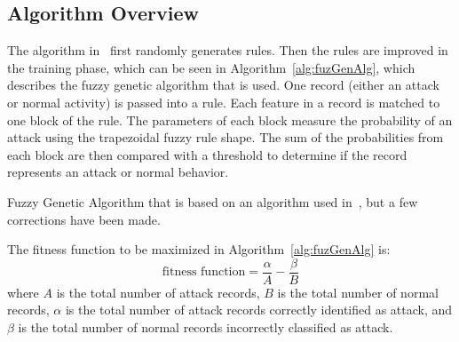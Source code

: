 \documentclass{sig-alternate}
\begin{document}
\subsection{Algorithm Overview}
The algorithm in~\cite{6496342, 6559603} first randomly generates rules. Then the rules are improved in the training phase, which can be seen in Algorithm~\ref{alg:fuzGenAlg}, which describes the fuzzy genetic algorithm that is used. One record (either an attack or normal activity) is passed into a rule. Each feature in a record is matched to one block of the rule. The parameters of each block measure the probability of an attack using the trapezoidal fuzzy rule shape. The sum of the probabilities from each block are then compared with a threshold to determine if the record represents an attack or normal behavior.

\begin{algorithm}[t]
\caption{Fuzzy Genetic Algorithm that is based on an algorithm used in~\cite{6496342, 6559603}, but a few corrections have been made.}
\label{alg:fuzGenAlg}
\begin{algorithmic}

    \ENDFOR
    
      \ELSE {}
    \ENDIF
  \ENDFOR
  
\ENDFOR
{}
\end{algorithmic}
\end{algorithm}


The fitness function to be maximized in Algorithm~\ref{alg:fuzGenAlg} is:
\begin{equation*}
\textrm{fitness function} = \frac{\alpha}{A} - \frac{\beta}{B}
\end{equation*}
where $A$ is the total number of attack records, $B$ is the total number of normal records, $\alpha$ is the total number of attack records correctly identified as attack, and $\beta$ is the total number of normal records incorrectly classified as attack.
\end{document}
